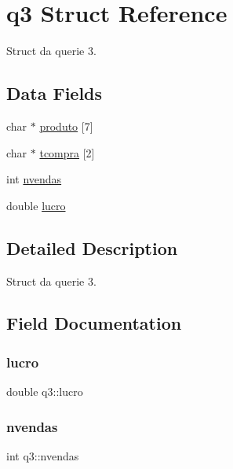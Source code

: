 \hypertarget{structq3}{}\section{q3 Struct Reference}
\label{structq3}


Struct da querie 3.  


\subsection*{Data Fields}
\begin{DoxyCompactItemize}
\item 
char $\ast$ \mbox{\hyperlink{structq3_a8df0bfcf987c6fbc8b06683be4f44842}{produto}} \mbox{[}7\mbox{]}
\item 
char $\ast$ \mbox{\hyperlink{structq3_ab726a8ec279be17c66c7bb4f6048da4f}{tcompra}} \mbox{[}2\mbox{]}
\item 
int \mbox{\hyperlink{structq3_a96d237d7ae9acd4cf45941e11b2b7c88}{nvendas}}
\item 
double \mbox{\hyperlink{structq3_ac69141cb2e2eaa0a1461169aaecba23f}{lucro}}
\end{DoxyCompactItemize}


\subsection{Detailed Description}
Struct da querie 3. 



\subsection{Field Documentation}
\mbox{\label{structq3_ac69141cb2e2eaa0a1461169aaecba23f}} 
\subsubsection{\texorpdfstring{lucro}{lucro}}
{\footnotesize\ttfamily double q3\+::lucro}

\mbox{\label{structq3_a96d237d7ae9acd4cf45941e11b2b7c88}} 
\subsubsection{\texorpdfstring{nvendas}{nvendas}}
{\footnotesize\ttfamily int q3\+::nvendas}


